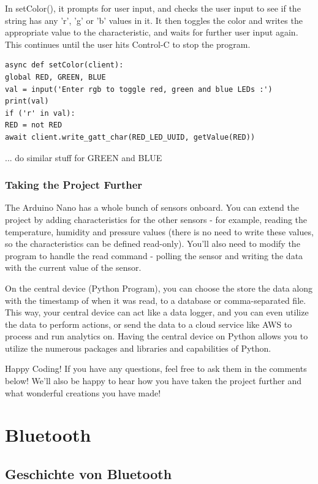 In setColor(), it prompts for user input, and checks the user input to see if the string has any 'r', 'g' or 'b' values in it. It then toggles the color and writes the appropriate value to the characteristic, and waits for further user input again. This continues until the user hits Control-C to stop the program.

\begin{lstlisting}
async def setColor(client):
global RED, GREEN, BLUE
val = input('Enter rgb to toggle red, green and blue LEDs :')
print(val)
if ('r' in val):
RED = not RED
await client.write_gatt_char(RED_LED_UUID, getValue(RED))
\end{lstlisting}


... do similar stuff for GREEN and BLUE

\subsection{Taking the Project Further}

The Arduino Nano has a whole bunch of sensors onboard. You can extend the project by adding characteristics for the other sensors - for example, reading the temperature, humidity and pressure values (there is no need to write these values, so the characteristics can be defined read-only). You'll also need to modify the program to handle the read command - polling the sensor and writing the data with the current value of the sensor.

On the central device (Python Program), you can choose the store the data along with the timestamp of when it was read, to a database or comma-separated file. This way, your central device can act like a data logger, and you can even utilize the data to perform actions, or send the data to a cloud service like AWS to process and run analytics on. Having the central device on Python allows you to utilize the numerous packages and libraries and capabilities of Python.

Happy Coding! If you have any questions, feel free to ask them in the comments below! We'll also be happy to hear how you have taken the project further and what wonderful creations you have made!


\chapter{Bluetooth}
\label{chap:bluetooth}

\section{Geschichte von Bluetooth}

